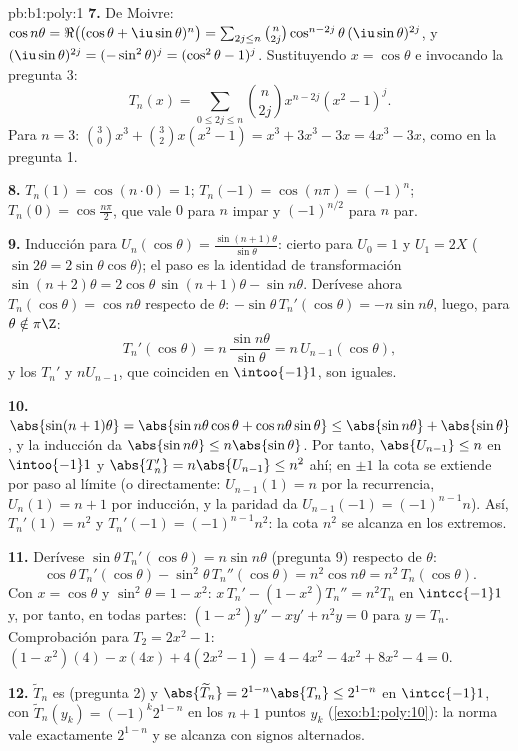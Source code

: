 \begin{solution}{pb:b1:poly:1}
\textbf{7.} De Moivre: $\cos n\theta = \Re\bigl((\cos\theta +
\iu\sin\theta)^n\bigr) = \sum_{2j \leq n}\binom n{2j}
\cos^{n-2j}\theta\,(\iu\sin\theta)^{2j}$, y
$(\iu\sin\theta)^{2j} = (-\sin^2\theta)^j = (\cos^2\theta - 1)^j$.
Sustituyendo $x = \cos\theta$ e invocando la pregunta 3:
\[
T_n(x) = \sum_{0\leq 2j\leq n}\binom n{2j}x^{n-2j}(x^2 - 1)^j .
\]
Para $n = 3$: $\binom30 x^3 + \binom32 x(x^2 - 1) = x^3 + 3x^3 - 3x =
4x^3 - 3x$, como en la pregunta 1.

\textbf{8.} $T_n(1) = \cos(n\cdot0) = 1$; $T_n(-1) = \cos(n\pi) =
(-1)^n$; $T_n(0) = \cos\frac{n\pi}2$, que vale $0$ para $n$ impar y
$(-1)^{n/2}$ para $n$ par.

\textbf{9.} Inducción para $U_n(\cos\theta) =
\frac{\sin(n+1)\theta}{\sin\theta}$: cierto para $U_0 = 1$ y $U_1 = 2X$
($\sin2\theta = 2\sin\theta\cos\theta$); el paso es la identidad de
transformación $\sin(n+2)\theta = 2\cos\theta\, \sin(n+1)\theta -
\sin n\theta$. Derívese ahora $T_n(\cos\theta) = \cos n\theta$ respecto
de $\theta$: $-\sin\theta\,T_n'(\cos\theta) = -n\sin n\theta$, luego,
para $\theta \notin \pi\Z$:
\[
T_n'(\cos\theta) = n\,\frac{\sin n\theta}{\sin\theta}
= n\,U_{n-1}(\cos\theta) ,
\]
y los  $T_n'$ y $nU_{n-1}$, que coinciden en $\intoo{-1}1$,
son iguales.

\textbf{10.} $\abs{\sin(n+1)\theta} = \abs{\sin n\theta\cos\theta
+ \cos n\theta\sin\theta} \leq \abs{\sin n\theta} + \abs{\sin\theta}$,
y la inducción da $\abs{\sin n\theta} \leq n\abs{\sin\theta}$. Por
tanto, $\abs{U_{n-1}} \leq n$ en $\intoo{-1}1$ y
$\abs{T_n'} = n\abs{U_{n-1}} \leq n^2$ ahí; en $\pm1$ la cota se
extiende por paso al límite (o directamente: $U_{n-1}(1) = n$ por la
recurrencia, $U_n(1) = n + 1$ por inducción, y la paridad da
$U_{n-1}(-1) = (-1)^{n-1}n$). Así, $T_n'(1) = n^2$ y
$T_n'(-1) = (-1)^{n-1}n^2$: la cota $n^2$ se alcanza en los extremos.

\textbf{11.} Derívese $\sin\theta\,T_n'(\cos\theta) = n\sin n\theta$
(pregunta 9) respecto de $\theta$:
\[
\cos\theta\,T_n'(\cos\theta) - \sin^2\theta\,T_n''(\cos\theta)
= n^2\cos n\theta = n^2\,T_n(\cos\theta) .
\]
Con $x = \cos\theta$ y $\sin^2\theta = 1 - x^2$:
$x\,T_n' - (1 - x^2)T_n'' = n^2T_n$ en $\intcc{-1}1$ y, por tanto, en
todas partes: $(1 - x^2)y'' - xy' + n^2y = 0$ para $y = T_n$.
Comprobación para $T_2 = 2x^2 - 1$: $(1 - x^2)(4) - x(4x) + 4(2x^2 - 1)
= 4 - 4x^2 - 4x^2 + 8x^2 - 4 = 0$.

\textbf{12.} $\widetilde T_n$ es  (pregunta 2) y
$\abs{\widetilde T_n} = 2^{1-n}\abs{T_n} \leq 2^{1-n}$ en
$\intcc{-1}1$, con $\widetilde T_n(y_k) = (-1)^k2^{1-n}$ en los $n + 1$
puntos $y_k$ (\cref{exo:b1:poly:10}): la norma vale exactamente
$2^{1-n}$ y se alcanza con signos alternados.


\end{solution}

